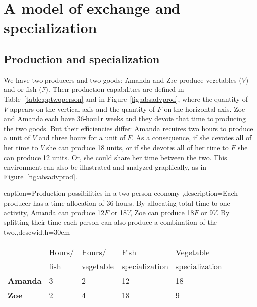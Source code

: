 \newpage
\section{A model of exchange and specialization}\label{sec:ch1sec4}

\subsection*{Production and specialization}

We have two producers and two goods: Amanda and Zoe produce vegetables ($V$)
and or fish ($F$). Their production capabilities are defined in Table~\ref{table:pptwoperson} 
and in Figure~\ref{fig:absadvprod}, where the quantity
of $V$ appears on the vertical axis and the quantity of $F$ on the
horizontal axis. Zoe and Amanda each have 36-hou1r weeks and they devote that
time to producing the two goods. But their efficiencies differ: Amanda
requires two hours to produce a unit of $V$ and three hours for a unit of $F$. 
As a consequence, if she devotes all of her time to $V$ she can produce 18
units, or if she devotes all of her time to $F$ she can produce 12 units.
Or, she could share her time between the two. This environment can also be
illustrated and analyzed graphically, as in Figure~\ref{fig:absadvprod}.

\begin{Table}{caption={Production possibilities in a two-person economy \label{table:pptwoperson}},description={Each producer has a time allocation of 36 hours. By allocating total time to one activity, Amanda can produce 12$F$ or 18$V$, Zoe can produce 18$F$ or 9$V$. By splitting their time each person can also produce a combination of the two.},descwidth={30em}}
	\begin{tabu} to \linewidth {|X[1,c]X[1,c]X[1,c]X[1,c]X[1,c]|}	\hline
						&	Hours/	&	Hours/		&	Fish		&	Vegetable	\\[-0.1em]
						&	fish	&	vegetable	&	specialization	&	specialization	\\
		\textbf{Amanda}						&	3		&	2			&	12			&	18			\\
		\textbf{Zoe}	&	2		&	4			&	18			&	9			\\	\hline
	\end{tabu}
\end{Table}

